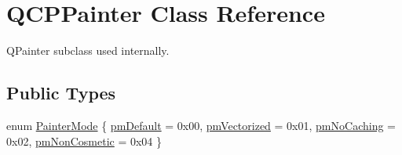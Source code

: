 \hypertarget{classQCPPainter}{\section{\-Q\-C\-P\-Painter \-Class \-Reference}
\label{classQCPPainter}
}


\-Q\-Painter subclass used internally.  


\subsection*{\-Public \-Types}
\begin{DoxyCompactItemize}
\item 
enum \hyperlink{classQCPPainter_a156cf16444ff5e0d81a73c615fdb156d}{\-Painter\-Mode} \{ \hyperlink{classQCPPainter_a156cf16444ff5e0d81a73c615fdb156da3bac5e87e3d58553b297befb4eee2a45}{pm\-Default} =  0x00, 
\hyperlink{classQCPPainter_a156cf16444ff5e0d81a73c615fdb156daeda679cd55dcd468341d07d48a30b6ab}{pm\-Vectorized} =  0x01, 
\hyperlink{classQCPPainter_a156cf16444ff5e0d81a73c615fdb156dae78f9a4eb277a5f9207f50850a51a0b0}{pm\-No\-Caching} =  0x02, 
\hyperlink{classQCPPainter_a156cf16444ff5e0d81a73c615fdb156dac1e481bfaf408f2bd2eaad3ec341f36b}{pm\-Non\-Cosmetic} =  0x04
 \}
\end{DoxyCompactItemize}
